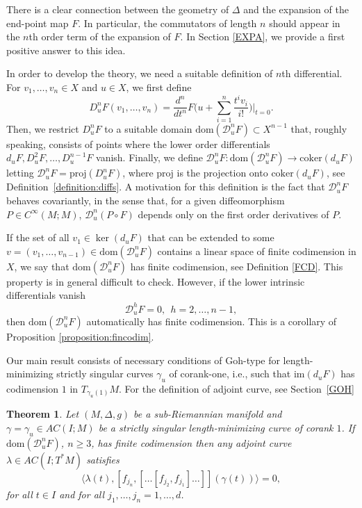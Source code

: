 \documentclass[12pt, reqno]{amsart}
\theoremstyle{plain}
\newtheorem {theorem}{Theorem}[section]
\theoremstyle{definition}
\theoremstyle{remark}
\numberwithin{equation}{section}
\newcommand{\0}{\theta}
\newcommand{\g}{\gamma}
\newcommand{\la}{\lambda}
\newcommand{\1}{{-1}}
\renewcommand{\=}{\coloneqq}
\renewcommand{\.}{\dots}
\newcommand{\mc}{\mathcal}
\newcommand{\proj}{\mathrm{proj}}
\newcommand{\coker}{\mathrm{coker}}
\newcommand{\dom}{\mathrm{dom}}
\newcommand{\be}{\begin{equation}}
\newcommand{\ee}{\end{equation}}
\begin{document}
There is a clear connection between the geometry of $\Delta$ and the expansion of the end-point map $F$. In particular, the commutators of length $n$ should appear  in the $n$th order term of the expansion of $F$. In Section \ref{EXPA}, we provide a first positive answer to this idea. 


In order to develop the theory,  we need a suitable definition of $n$th   differential.
For $v_1,\ldots,v_n \in X$ and  $u\in X$, we first define
\[
D_u^n F(v_1,\dots,v_n) =
\frac{d^n}{dt^n} F\Big( u+\sum_{i=1}^n\frac{t^i v_i}{i!}\Big)\bigg|_{t=0} .
\]
Then, we restrict $D_u^n F$  to a suitable domain  $\dom(\mc D_u^n F)\subset X^{n-1}$ that, roughly speaking, consists of points where the lower order differentials
$d_uF, D_u^2F,\dots, D_u^{n-1}F$ vanish. Finally,   we define 
$\mc{ D}_u^n F :\dom(\mc D_u^n F)\to \coker(d_u F)$ letting
$\mc{ D}_u^n F = \proj(
D_u^n F)$, where   $\proj$   is the  projection onto $ \coker(d_u F)$, see Definition~\ref{definition:diffs}.
A motivation for this definition is the fact that 
$\mc{ D}_u^n F $ behaves covariantly, in the sense that, for a given  diffeomorphism $P\in C^\infty(M;M)$, 
$\mc{ D}_u^n (P\circ F)$ depends only on the first order derivatives of $P$.


{\color{black}  
If the set of all $v_1\in \ker(d_uF)$ that can be extended to some $v=(v_1,\ldots,v_{n-1})\in \dom (\mc D_u^n F)$
contains a linear space of finite codimension in $X$, we say that $\dom (\mc D_u^n F)$ has finite codimension, see Definition \ref{FCD}.
This property is in general difficult to check. However, 
if the lower intrinsic differentials vanish
	\be\label{eq:Gohn}
		\mc{D}^h_u F =0, \ \  h=2,\dots,n-1,
	\ee
then $\dom (\mc D_u^n F)$ automatically has finite codimension. This is a corollary of Proposition \ref{proposition:fincodim}.
}


Our main result consists of necessary conditions of Goh-type for length-minimizing strictly singular curves 
 $\g_u$  of corank-one, i.e., such that  $\mathrm{im}(d_uF)$ has codimension  $1$ in $T_{\g_u(1)}M$.
For the definition of adjoint curve, see Section~\ref{GOH}


 

\begin{theorem}\label{Gohnintro}
	Let $(M,\Delta,g)$ be a sub-Riemannian manifold and  $\gamma=\gamma_u \in AC ( I ; M)$ be a strictly singular length-minimizing curve of corank $1$.
	{\color{black} If  $\dom(\mc D_u ^nF)$,  $n\geq 3$,  has finite codimension} then any adjoint curve $\la \in AC( I ;  T^*M)$ satisfies   \begin{equation}
 \label{DELTAintro}
 \langle \la(t), [f_{j_n},[\.[f_{j_{2}},f_{j_1}]\.]](\gamma(t)) \rangle=0,
 \end{equation} 
 for all  $t\in I $ and for all  $j_1,\.,j_n=1,\.,d$.
 \end{theorem}
\end{document}
